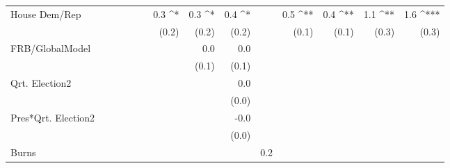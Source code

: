 \documentclass[a4paper]{article}\usepackage{graphicx, color}
\begin{document}
\begin{table}[ht]
\begin{center}
{\begin{tabular}{ l D{.}{.}{1}D{.}{.}{1}D{.}{.}{1}D{.}{.}{1}D{.}{.}{1}D{.}{.}{1}D{.}{.}{1}D{.}{.}{1}D{.}{.}{1}D{.}{.}{1}D{.}{.}{1}D{.}{.}{1}D{.}{.}{1} }
House Dem/Rep        &                 &                 &                 &                 &                 & 0.3 ^*          & 0.3 ^*          & 0.4 ^*          &                 & 0.5 ^{**}       & 0.4 ^{**}       & 1.1 ^{**}       & 1.6 ^{***}     \\ 
                     &                 &                 &                 &                 &                 & (0.2)           & (0.2)           & (0.2)           &                 & (0.1)           & (0.1)           & (0.3)           & (0.3)          \\ 
FRB/GlobalModel      &                 &                 &                 &                 &                 &                 & 0.0             & 0.0             &                 &                 &                 &                 &                \\ 
                     &                 &                 &                 &                 &                 &                 & (0.1)           & (0.1)           &                 &                 &                 &                 &                \\ 
Qrt. Election2       &                 &                 &                 &                 &                 &                 &                 & 0.0             &                 &                 &                 &                 &                \\ 
                     &                 &                 &                 &                 &                 &                 &                 & (0.0)           &                 &                 &                 &                 &                \\ 
Pres*Qrt. Election2  &                 &                 &                 &                 &                 &                 &                 & -0.0            &                 &                 &                 &                 &                \\ 
                     &                 &                 &                 &                 &                 &                 &                 & (0.0)           &                 &                 &                 &                 &                \\ 
Burns                &                 &                 &                 &                 &                 &                 &                 &                 & 0.2             &                 &                 &                 &                \\ 

\end{tabular}}
\end{center}
\end{table}
\end{document}
